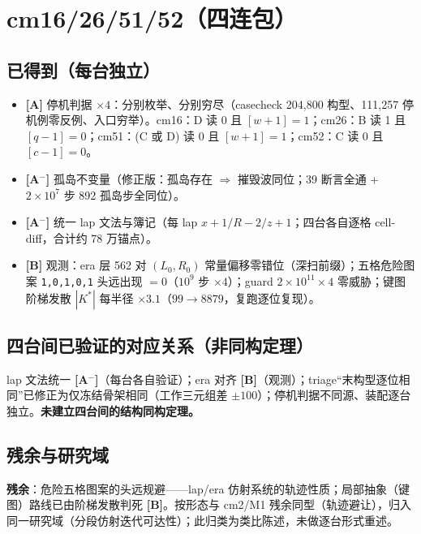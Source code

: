 \documentclass[11pt]{ctexart}
\newcommand{\grA}{\textbf{[A]}}
\newcommand{\grAm}{\textbf{[A$^-$]}}
\newcommand{\grB}{\textbf{[B]}}
\begin{document}
\section{cm16/26/51/52（四连包）}

\subsection{已得到（每台独立）}
\begin{itemize}
\item \grA{} 停机判据 $\times4$：分别枚举、分别穷尽（casecheck 204,800 构型、111,257 停机例零反例、入口穷举）。cm16：D 读 0 且 $[w{+}1]{=}1$；cm26：B 读 1 且 $[q{-}1]{=}0$；cm51：(C 或 D) 读 0 且 $[w{+}1]{=}1$；cm52：C 读 0 且 $[c{-}1]{=}0$。
\item \grAm{} 孤岛不变量（修正版：孤岛存在 $\Rightarrow$ 摧毁波同位；39 断言全通 + $2\times10^7$ 步 892 孤岛步全同位）。
\item \grAm{} 统一 lap 文法与簿记（每 lap $x{+}1/R{-}2/z{+}1$；四台各自逐格 cell-diff，合计约 78 万锚点）。
\item \grB{} 观测：era 层 562 对 $(L_0,R_0)$ 常量偏移零错位（深扫前缀）；五格危险图案 \texttt{1,0,1,0,1} 头远出现 $=0$（$10^9$ 步 $\times4$）；guard $2\times10^{11}\times4$ 零威胁；键图阶梯发散 $|K^*|$ 每半径 $\times3.1$（$99{\to}8879$，复跑逐位复现）。
\end{itemize}

\subsection{四台间已验证的对应关系（非同构定理）}
lap 文法统一 \grAm{}（每台各自验证）；era 对齐 \grB{}（观测）；triage``末构型逐位相同''已修正为仅冻结骨架相同（工作三元组差 $\pm100$）；停机判据不同源、装配逐台独立。\textbf{未建立四台间的结构同构定理。}

\subsection{残余与研究域}
\textbf{残余}：危险五格图案的头远规避——lap/era 仿射系统的轨迹性质；局部抽象（键图）路线已由阶梯发散判死 \grB{}。按形态与 cm2/M1 残余同型（轨迹避让），归入同一研究域（分段仿射迭代可达性）；此归类为类比陈述，未做逐台形式重述。
\end{document}
